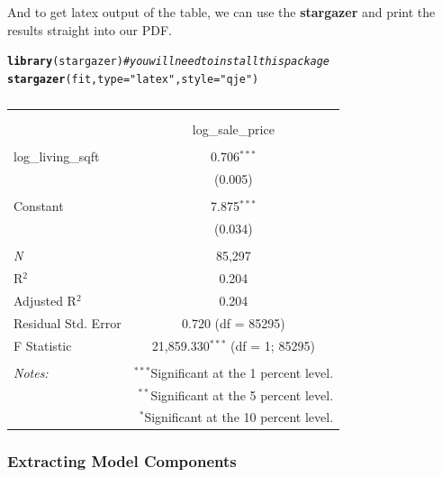 \documentclass[10pt]{article}\usepackage[]{graphicx}\usepackage[]{color}
\makeatletter
\newcommand{\hlstr}[1]{\textcolor[rgb]{0.192,0.494,0.8}{#1}}%
\newcommand{\hlcom}[1]{\textcolor[rgb]{0.678,0.584,0.686}{\textit{#1}}}%
\newcommand{\hlstd}[1]{\textcolor[rgb]{0.345,0.345,0.345}{#1}}%
\newcommand{\hlkwc}[1]{\textcolor[rgb]{0.333,0.667,0.333}{#1}}%
\newcommand{\hlkwd}[1]{\textcolor[rgb]{0.737,0.353,0.396}{\textbf{#1}}}%
\newenvironment{kframe}{%
 \def\at@end@of@kframe{}%
 \ifinner\ifhmode%
  \def\at@end@of@kframe{\end{minipage}}%
  \begin{minipage}{\columnwidth}%
 \fi\fi%
 \def\FrameCommand##1{\hskip\@totalleftmargin \hskip-\fboxsep
 \colorbox{shadecolor}{##1}\hskip-\fboxsep
     \hskip-\linewidth \hskip-\@totalleftmargin \hskip\columnwidth}%
 \MakeFramed {\advance\hsize-\width
   \@totalleftmargin\z@ \linewidth\hsize
   \@setminipage}}%
 {\par\unskip\endMakeFramed%
 \at@end@of@kframe}
\makeatother
\begin{document}
And to get latex output of the table, we can use the { \bf stargazer } and print the results straight into our PDF.

\begin{kframe}
\begin{alltt}
\hlkwd{library}\hlstd{(stargazer)} \hlcom{# you will need to install this package}
\hlkwd{stargazer}\hlstd{(fit,}\hlkwc{type}\hlstd{=}\hlstr{"latex"}\hlstd{,}\hlkwc{style}\hlstd{=}\hlstr{"qje"}\hlstd{)}
\end{alltt}
\end{kframe}
\begin{table}[!htbp] \centering 
  \caption{} 
  \label{} 
\begin{tabular}{@{\extracolsep{5pt}}lc} 
\\[-1.8ex]\hline 
\hline \\[-1.8ex] 
\\[-1.8ex] & log\_sale\_price \\ 
\hline \\[-1.8ex] 
 log\_living\_sqft & 0.706$^{***}$ \\ 
  & (0.005) \\ 
  & \\ 
 Constant & 7.875$^{***}$ \\ 
  & (0.034) \\ 
  & \\ 
\textit{N} & 85,297 \\ 
R$^{2}$ & 0.204 \\ 
Adjusted R$^{2}$ & 0.204 \\ 
Residual Std. Error & 0.720 (df = 85295) \\ 
F Statistic & 21,859.330$^{***}$ (df = 1; 85295) \\ 
\hline 
\hline \\[-1.8ex] 
\textit{Notes:} & \multicolumn{1}{r}{$^{***}$Significant at the 1 percent level.} \\ 
 & \multicolumn{1}{r}{$^{**}$Significant at the 5 percent level.} \\ 
 & \multicolumn{1}{r}{$^{*}$Significant at the 10 percent level.} \\ 
\end{tabular} 
\end{table} 



\subsubsection*{Extracting Model Components}
\end{document}
